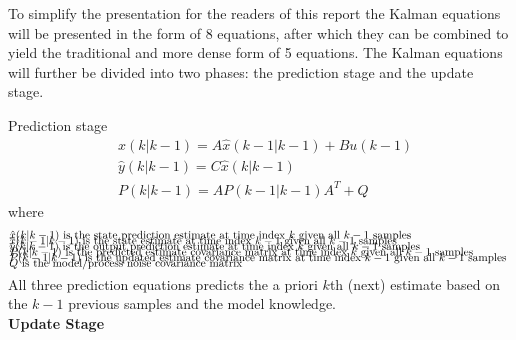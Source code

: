 To simplify the presentation for the readers of this report the Kalman equations will be presented in the form of 8 equations, after which they can be combined to yield the traditional and more dense form of 5 equations.
The Kalman equations will further be divided into two phases: the prediction stage and the update stage. 

{Prediction stage}
\begin{align}
	&\hat{{x}}	(k|k-1) = {A} 	\hat{{x}}(k-1|k-1) + {B}{u}(k-1)  				\label{eq:Kalman_pred_state} 	\\
	&\hat{{y}}	(k|k-1) = {C}	\hat{{x}}(k|k-1)										\label{eq:Kalman_pred_output} 	\\
	&{P}			(k|k-1) = {A}	{P}(k-1|k-1){A}^T+{Q} 								\label{eq:Kalman_pred_cov} 		
\end{align}
where 
\begin{align*}
	&\text{$\hat{{x}}	(k|k-1)$ 	is the state prediction 			estimate at time index $k$ 		given all $ k-1 $ samples		}	\\[-1em]
	&\text{$\hat{{x}}	(k-1|k-1)$ 	is the state 						estimate at time index $k-1$ 	given all $ k-1 $ samples		}	\\[-1em]
	&\text{$\hat{{y}}	(k|k-1)$ 	is the output prediction 			estimate at time index $k$ 		given all $ k-1 $ samples		}	\\[-1em]
	&\text{${P}			(k|k-1)$ 	is the predicted estimate  covariance matrix at time index $k$ 		given all $ k-1 $ samples		}	\\[-1em]
	&\text{${P}			(k-1|k-1)$ 	is the updated estimate    covariance matrix at time index $k-1$ 	given all $ k-1 $ samples		}	\\[-1em]
	&\text{${Q}$						is the model/process noise covariance matrix														}	\\[-1em]
\end{align*}

All three prediction equations predicts the a priori $k$th (next) estimate based on the $k-1$ previous samples and the model knowledge.\\

\textbf{Update Stage}

